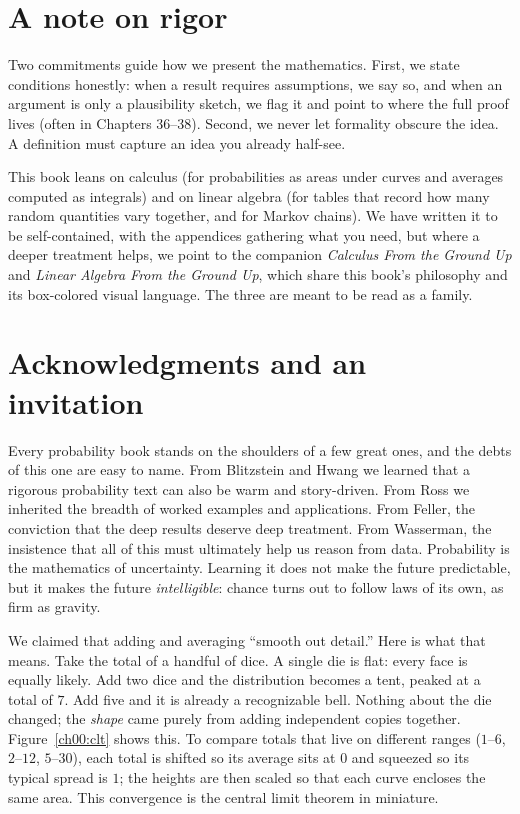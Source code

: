 \section*{A note on rigor}
\label{ch00:rigor}

Two commitments guide how we present the mathematics. First, we state conditions
honestly: when a result requires assumptions, we say so, and when an argument is
only a plausibility sketch, we flag it and point to where the full
proof lives (often in Chapters 36--38). Second, we never let formality obscure
the idea. A definition must capture an idea you already half-see.

\begin{connectionbox}
This book leans on calculus (for probabilities as areas under curves and
averages computed as integrals) and on linear algebra (for tables that record
how many random quantities vary together, and for Markov chains). We have
written it to be self-contained, with the
appendices gathering what you need, but where a deeper treatment helps, we point
to the companion \emph{Calculus From the Ground Up} and \emph{Linear Algebra
From the Ground Up}, which share this book's philosophy and its box-colored
visual language. The three are meant to be read as a family.
\end{connectionbox}

\section*{Acknowledgments and an invitation}
\label{ch00:acknowledgments}

Every probability book stands on the shoulders of a few great ones, and the
debts of this one are easy to name. From Blitzstein and Hwang we learned that a
rigorous probability text can also be warm and story-driven. From Ross
we inherited the breadth of worked examples and applications. From Feller, the
conviction that the deep results deserve deep treatment. From Wasserman, the
insistence that all of this
must ultimately help us reason from data. 
Probability is the mathematics of
uncertainty. Learning it does not make the future predictable, but it makes the
future \emph{intelligible}: chance turns out to follow laws of its own, as firm
as gravity.

We claimed that adding and averaging ``smooth out detail.'' Here is what
that means. Take the total of a handful of dice. A single die
is flat: every face is equally likely. Add two dice and the distribution becomes a
tent, peaked at a total of $7$. Add five and it is already a recognizable bell. Nothing
about the die changed; the \emph{shape} came purely from adding independent
copies together. Figure~\ref{ch00:clt} shows this. To compare totals that live
on different ranges ($1$--$6$, $2$--$12$, $5$--$30$), each total is shifted so
its average sits at $0$ and squeezed so its typical spread is $1$; the heights are
then scaled so that each curve encloses the same area. This convergence is the
central limit theorem in miniature.

